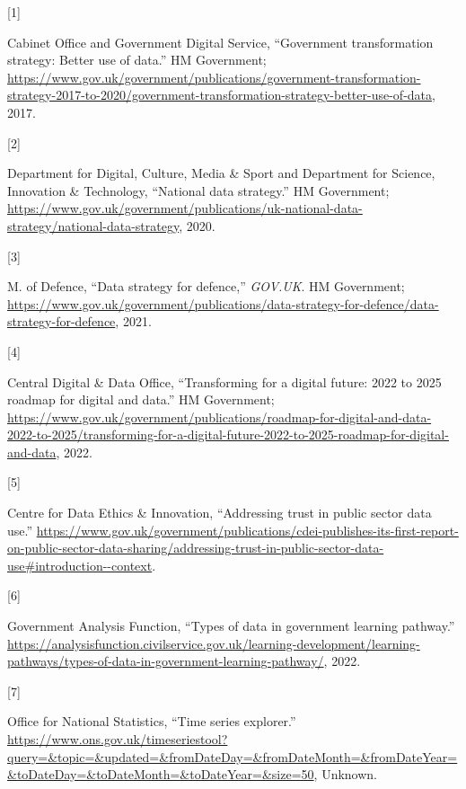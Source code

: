 \documentclass{article}
\newlength{\cslhangindent}
\newlength{\csllabelwidth}
\newlength{\cslentryspacingunit} %
\newenvironment{CSLReferences}[2] %
 {%
  \setlength{\parindent}{0pt}
  \ifodd #1
  \let\oldpar\par
  \def\par{\hangindent=\cslhangindent\oldpar}
  \fi
  \setlength{\parskip}{#2\cslentryspacingunit}
 }%
 {}
\newcommand{\CSLLeftMargin}[1]{\parbox[t]{\csllabelwidth}{#1}}
\newcommand{\CSLRightInline}[1]{\parbox[t]{\linewidth - \csllabelwidth}{#1}\break}
\begin{document}
\hypertarget{refs}{}
\begin{CSLReferences}{0}{0}
\leavevmode{}%
\CSLLeftMargin{{[}1{]} }%
\CSLRightInline{Cabinet Office and Government Digital Service,
{``Government transformation strategy: Better use of data.''} HM
Government;
\url{https://www.gov.uk/government/publications/government-transformation-strategy-2017-to-2020/government-transformation-strategy-better-use-of-data},
2017.}

\leavevmode{}%
\CSLLeftMargin{{[}2{]} }%
\CSLRightInline{Department for Digital, Culture, Media \& Sport and
Department for Science, Innovation \& Technology, {``National data
strategy.''} HM Government;
\url{https://www.gov.uk/government/publications/uk-national-data-strategy/national-data-strategy},
2020.}

\leavevmode{}%
\CSLLeftMargin{{[}3{]} }%
\CSLRightInline{M. of Defence, {``Data strategy for defence,''}
\emph{GOV.UK}. HM Government;
\url{https://www.gov.uk/government/publications/data-strategy-for-defence/data-strategy-for-defence},
2021.}

\leavevmode{}%
\CSLLeftMargin{{[}4{]} }%
\CSLRightInline{Central Digital \& Data Office, {``Transforming for a
digital future: 2022 to 2025 roadmap for digital and data.''} HM
Government;
\url{https://www.gov.uk/government/publications/roadmap-for-digital-and-data-2022-to-2025/transforming-for-a-digital-future-2022-to-2025-roadmap-for-digital-and-data},
2022.}

\leavevmode{}%
\CSLLeftMargin{{[}5{]} }%
\CSLRightInline{Centre for Data Ethics \& Innovation, {``Addressing
trust in public sector data use.''}
\url{https://www.gov.uk/government/publications/cdei-publishes-its-first-report-on-public-sector-data-sharing/addressing-trust-in-public-sector-data-use\#introduction--context}.}

\leavevmode{}%
\CSLLeftMargin{{[}6{]} }%
\CSLRightInline{Government Analysis Function, {``Types of data in
government learning pathway.''}
\url{https://analysisfunction.civilservice.gov.uk/learning-development/learning-pathways/types-of-data-in-government-learning-pathway/},
2022.}

\leavevmode{}%
\CSLLeftMargin{{[}7{]} }%
\CSLRightInline{Office for National Statistics, {``Time series
explorer.''}
\url{https://www.ons.gov.uk/timeseriestool?query=\&topic=\&updated=\&fromDateDay=\&fromDateMonth=\&fromDateYear=\&toDateDay=\&toDateMonth=\&toDateYear=\&size=50},
Unknown.}


\end{CSLReferences}
\end{document}

